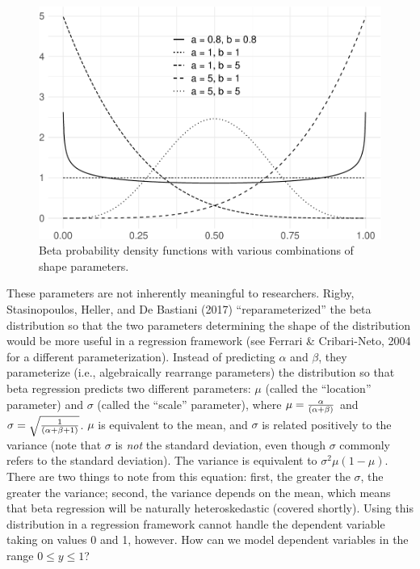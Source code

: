 \documentclass[english,,man]{apa6}
\begin{document}
\begin{figure}
\centering
\includegraphics{beta_hurdle_files/figure-latex/unnamed-chunk-2-1.pdf}
\caption{\label{fig:unnamed-chunk-2}Beta probability density functions with various combinations of shape parameters.}
\end{figure}

These parameters are not inherently meaningful to researchers. Rigby, Stasinopoulos, Heller, and De Bastiani (2017) \enquote{reparameterized} the beta distribution so that the two parameters determining the shape of the distribution would be more useful in a regression framework (see Ferrari \& Cribari-Neto, 2004 for a different parameterization). Instead of predicting \(\alpha\) and \(\beta\), they parameterize (i.e., algebraically rearrange parameters) the distribution so that beta regression predicts two different parameters: \(\mu\) (called the \enquote{location} parameter) and \(\sigma\) (called the \enquote{scale} parameter), where \(\mu={\alpha\over(\alpha+\beta)}\) and \(\sigma=\sqrt{1\over(\alpha+\beta+1)}\). \(\mu\) is equivalent to the mean, and \(\sigma\) is related positively to the variance (note that \(\sigma\) is \emph{not} the standard deviation, even though \(\sigma\) commonly refers to the standard deviation). The variance is equivalent to \(\sigma^2\mu(1-\mu)\). There are two things to note from this equation: first, the greater the \(\sigma\), the greater the variance; second, the variance depends on the mean, which means that beta regression will be naturally heteroskedastic (covered shortly). Using this distribution in a regression framework cannot handle the dependent variable taking on values 0 and 1, however. How can we model dependent variables in the range \(0 \leq y \leq 1\)?
\end{document}
